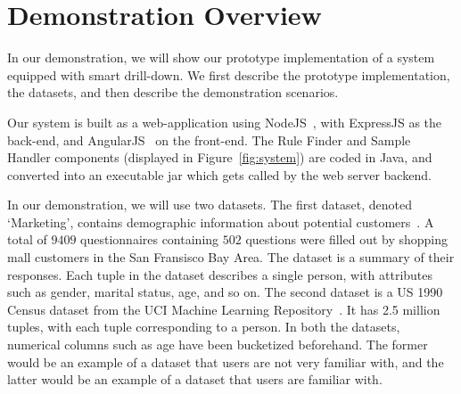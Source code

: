 
\section{Demonstration Overview} \label{sec:demo} 
In our demonstration, we will show our prototype implementation of a system equipped with smart drill-down. We first describe the prototype implementation, the datasets, and then describe the demonstration scenarios.

 Our system is built as a web-application using NodeJS~\cite{nodejs}, with ExpressJS as the back-end, and AngularJS~\cite{angular} on the front-end. The Rule Finder and Sample Handler components (displayed in Figure~\ref{fig:system}) are coded in Java, and converted into an executable jar which gets called by the web server backend. 

 In our demonstration, we will use two datasets. The first dataset, denoted `Marketing', contains demographic information about potential customers~\cite{dataset1}. A total of $9409$ questionnaires containing $502$ questions were filled out by shopping mall customers in the San Fransisco Bay Area. The dataset is a summary of their responses. Each tuple in the dataset describes a single person, with attributes such as gender, marital status, age, and so on. The second dataset is a US 1990 Census dataset from the UCI Machine Learning Repository~\cite{uciml}. It has 2.5 million tuples, with each tuple corresponding to a person. In both the datasets, numerical columns such as age have been bucketized beforehand. The former would be an example of a dataset that users are not very familiar with, and the latter would be an example of a dataset that users are familiar with.


